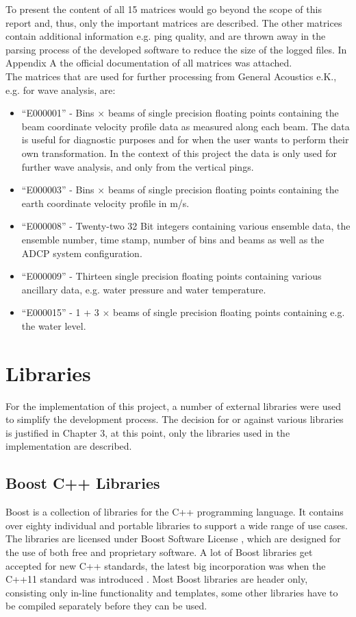 To present the content of all 15 matrices would go beyond the scope of this report and, thus, only the important matrices are described. The other matrices contain additional information e.g. ping quality, and are thrown away in the parsing process of the developed software to reduce the size of the logged files. In Appendix A the official documentation of all matrices was attached.\\
The matrices that are used for further processing from General Acoustics e.K., e.g. for wave analysis, are:
\begin{itemize}
\item ``E000001'' - Bins $\times$ beams of single precision floating points containing the beam coordinate velocity profile data as measured along each beam. The data is useful for diagnostic purposes and for when the user wants to perform their own transformation. In the context of this project the data is only used for further wave analysis, and only from the vertical pings.
\item``E000003'' - Bins $\times$ beams of single precision floating points containing the earth coordinate velocity profile in m/s. 
\item ``E000008'' - Twenty-two 32 Bit integers containing various ensemble data, the ensemble number, time stamp, number of bins and beams as well as the ADCP system configuration.
\item ``E000009'' - Thirteen single precision floating points containing various ancillary data, e.g. water pressure and water temperature.
\item ``E000015'' - 1 + 3 $\times$ beams of single precision floating points containing e.g. the water level. 
\end{itemize}

\section{Libraries}
For the implementation of this project, a number of external libraries were used to simplify the development process. The decision for or against various libraries is justified in Chapter 3, at this point, only the libraries used in the implementation are described.
\subsection{Boost C++ Libraries}
Boost \cite{boost} is a collection of libraries for the C++ programming language. It contains over eighty individual and portable libraries to support a wide range of use cases. The libraries are licensed under Boost Software License \cite{boostliz}, which are designed for the use of both free and proprietary software. A lot of Boost libraries get accepted for new C++ standards, the latest big incorporation was when the C++11 standard was introduced \cite{booststd}. Most Boost libraries are header only, consisting only in-line functionality and templates, some other libraries have to be compiled separately before they can be used.

